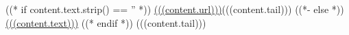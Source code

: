 ((* if content.text.strip() == '' *))
\url{(((content.url)))}(((content.tail)))
((*- else *)) \href{(((content.url)))}{(((content.text)))}
((* endif *)) (((content.tail)))
